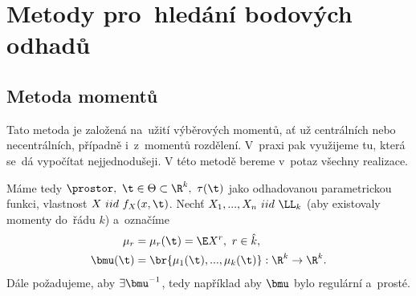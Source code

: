 
\chapter{Metody pro~hledání bodových odhadů}\label{kapitola2}


\section{Metoda momentů}
Tato metoda je založená na~užití výběrových momentů, ať už centrálních nebo necentrálních, případně i~z~momentů rozdělení. V~praxi pak využijeme tu, která se~dá vypočítat nejjednodušeji.
V této metodě bereme v~potaz všechny realizace.

Máme tedy $\prostor,~\t\in\Theta\subset\R^k,~\tau(\t)$ jako odhadovanou parametrickou funkci, vlastnost $X~iid~f_X(x,\t)$. Nechť $X_1,...,X_n~iid~\LL_k$ (aby existovaly momenty do~řádu $k$) a~označíme \[
\begin{split}
\mu_r&=\mu_r(\t)=\E X^r,~r\in\hat{k},\\
\bmu(\t)&=\br{\mu_1(\t),...,\mu_k(\t)}:\R^k\to\R^k.
\end{split}
\]
Dále požadujeme, aby $\exists\bmu^{-1}$, tedy například aby $\bmu$ bylo regulární a~prosté. 

